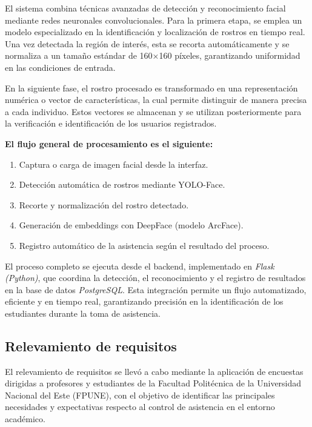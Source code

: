 El sistema combina técnicas avanzadas de detección y reconocimiento facial mediante redes neuronales convolucionales. Para la primera etapa, se emplea un modelo especializado en la identificación y localización de rostros en tiempo real. Una vez detectada la región de interés, esta se recorta automáticamente y se normaliza a un tamaño estándar de 160×160 píxeles, garantizando uniformidad en las condiciones de entrada.

En la siguiente fase, el rostro procesado es transformado en una representación numérica o vector de características, la cual permite distinguir de manera precisa a cada individuo. Estos vectores se almacenan y se utilizan posteriormente para la verificación e identificación de los usuarios registrados.

\textbf{El flujo general de procesamiento es el siguiente:}

\begin{enumerate}
    \item Captura o carga de imagen facial desde la interfaz.
    \item Detección automática de rostros mediante YOLO-Face.
    \item Recorte y normalización del rostro detectado.
    \item Generación de embeddings con DeepFace (modelo ArcFace).
    \item Registro automático de la asistencia según el resultado del proceso.
\end{enumerate}

El proceso completo se ejecuta desde el backend, implementado en \textit{Flask (Python)}, que coordina la detección, el reconocimiento y el registro de resultados en la base de datos \textit{PostgreSQL}.  
Esta integración permite un flujo automatizado, eficiente y en tiempo real, garantizando precisión en la identificación de los estudiantes durante la toma de asistencia.

\subsection{Relevamiento de requisitos}

El relevamiento de requisitos se llevó a cabo mediante la aplicación de encuestas dirigidas a profesores y estudiantes de la Facultad Politécnica de la Universidad Nacional del Este (FPUNE), con el objetivo de identificar las principales necesidades y expectativas respecto al control de asistencia en el entorno académico.  

